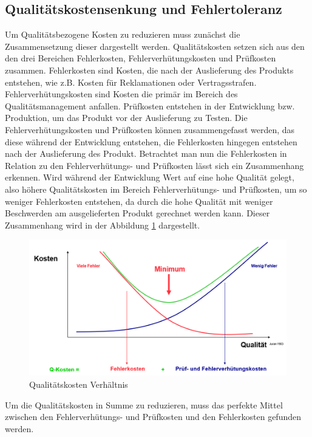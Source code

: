 \subsection{Qualitätskostensenkung und Fehlertoleranz}
Um Qualitätsbezogene Kosten zu reduzieren muss zunächst die Zusammensetzung dieser dargestellt werden.
Qualitätskosten setzen sich aus den den drei Bereichen Fehlerkosten, Fehlerverhütungskosten und Prüfkosten zusammen.
Fehlerkosten sind Kosten, die nach der Auslieferung des Produkts entstehen, wie z.B. Kosten für Reklamationen oder Vertragsstrafen.
Fehlerverhütungskosten sind Kosten die primär im Bereich des Qualitätsmanagement anfallen.
Prüfkosten entstehen in der Entwicklung bzw. Produktion, um das Produkt vor der Auslieferung zu Testen.
Die Fehlerverhütungskosten und Prüfkosten können zusammengefasst werden, das diese während der Entwicklung entstehen, die Fehlerkosten hingegen entstehen nach der Auslieferung des Produkt.
\newparagraph
Betrachtet man nun die Fehlerkosten in Relation zu den Fehlerverhütungs- und Prüfkosten lässt sich ein Zusammenhang erkennen.
Wird während der Entwicklung Wert auf eine hohe Qualität gelegt, also höhere Qualitätskosten im Bereich Fehlerverhütungs- und Prüfkosten, um so weniger Fehlerkosten entstehen, da durch die hohe Qualität mit weniger Beschwerden am ausgelieferten Produkt gerechnet werden kann.
Dieser Zusammenhang wird in der Abbildung \ref{fig:QKostenVerhaeltnis} dargestellt.
\begin{figure}[H]
    \centering
    \includegraphics[width=1\textwidth]{images/qkostenverhaeltnis.png}
    \caption{Qualitätskosten Verhältnis}
    \label{fig:QKostenVerhaeltnis}
\end{figure}\noindent
Um die Qualitätskosten in Summe zu reduzieren, muss das perfekte Mittel zwischen den Fehlerverhütungs- und Prüfkosten und den Fehlerkosten gefunden werden.
